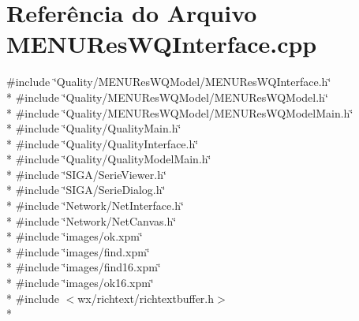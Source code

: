\section{Referência do Arquivo M\+E\+N\+U\+Res\+W\+Q\+Interface.\+cpp}
\label{_m_e_n_u_res_w_q_interface_8cpp}
{\ttfamily \#include \char`\"{}Quality/\+M\+E\+N\+U\+Res\+W\+Q\+Model/\+M\+E\+N\+U\+Res\+W\+Q\+Interface.\+h\char`\"{}}\\*
{\ttfamily \#include \char`\"{}Quality/\+M\+E\+N\+U\+Res\+W\+Q\+Model/\+M\+E\+N\+U\+Res\+W\+Q\+Model.\+h\char`\"{}}\\*
{\ttfamily \#include \char`\"{}Quality/\+M\+E\+N\+U\+Res\+W\+Q\+Model/\+M\+E\+N\+U\+Res\+W\+Q\+Model\+Main.\+h\char`\"{}}\\*
{\ttfamily \#include \char`\"{}Quality/\+Quality\+Main.\+h\char`\"{}}\\*
{\ttfamily \#include \char`\"{}Quality/\+Quality\+Interface.\+h\char`\"{}}\\*
{\ttfamily \#include \char`\"{}Quality/\+Quality\+Model\+Main.\+h\char`\"{}}\\*
{\ttfamily \#include \char`\"{}S\+I\+G\+A/\+Serie\+Viewer.\+h\char`\"{}}\\*
{\ttfamily \#include \char`\"{}S\+I\+G\+A/\+Serie\+Dialog.\+h\char`\"{}}\\*
{\ttfamily \#include \char`\"{}Network/\+Net\+Interface.\+h\char`\"{}}\\*
{\ttfamily \#include \char`\"{}Network/\+Net\+Canvas.\+h\char`\"{}}\\*
{\ttfamily \#include \char`\"{}images/ok.\+xpm\char`\"{}}\\*
{\ttfamily \#include \char`\"{}images/find.\+xpm\char`\"{}}\\*
{\ttfamily \#include \char`\"{}images/find16.\+xpm\char`\"{}}\\*
{\ttfamily \#include \char`\"{}images/ok16.\+xpm\char`\"{}}\\*
{\ttfamily \#include $<$wx/richtext/richtextbuffer.\+h$>$}\\*
